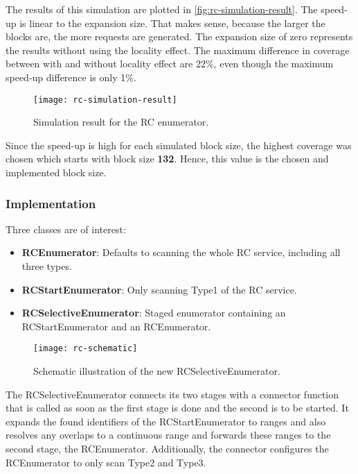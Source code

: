 The results of this simulation are plotted in \autoref{fig:rc-simulation-result}. The speed-up is linear to the expansion size. That makes sense, because the larger the blocks are, the more requests are generated. The expansion size of zero represents the results without using the locality effect. The maximum difference in coverage between with and without locality effect are 22\%, even though the maximum speed-up difference is only 1\%.

\begin{figure}[h]
    \centering
    \texttt{[image: rc-simulation-result]}
    \caption{Simulation result for the RC enumerator.}
    \label{fig:rc-simulation-result}
\end{figure}

Since the speed-up is high for each simulated block size, the highest coverage was chosen which starts with block size \textbf{132}. Hence, this value is the chosen and implemented block size.

\subsubsection{Implementation}

Three classes are of interest:

\begin{itemize}
    \item \textbf{RCEnumerator}: Defaults to scanning the whole RC service, including all three types.
    \item \textbf{RCStartEnumerator}: Only scanning Type1 of the RC service.
    \item \textbf{RCSelectiveEnumerator}: Staged enumerator containing an RCStartEnumerator and an RCEnumerator.
\end{itemize}

\begin{figure}[h]
    \centering
    \texttt{[image: rc-schematic]}
    \caption{Schematic illustration of the new RCSelectiveEnumerator.}
    \label{fig:rc-schematic}
\end{figure}

The RCSelectiveEnumerator connects its two stages with a connector function that is called as soon as the first stage is done and the second is to be started. It expands the found identifiers of the RCStartEnumerator to ranges and also resolves any overlaps to a continuous range and forwards these ranges to the second stage, the RCEnumerator. Additionally, the connector configures the RCEnumerator to only scan Type2 and Type3.

